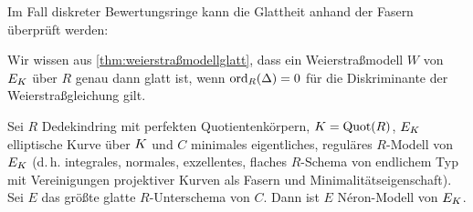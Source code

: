 \documentclass[german]{scrreprt}
\begin{document}
Im Fall diskreter Bewertungsringe kann die Glattheit anhand der Fasern
überprüft werden:
\begin{Bemerkung}
  Wir wissen aus \autoref{thm:weierstraßmodellglatt},
  dass ein Weierstraßmodell $W$ von $E_{K}$ über $R$ genau dann glatt
  ist, wenn $\operatorname{ord}_R(\Delta)=0$ für die Diskriminante der
  Weierstraßgleichung gilt.
\end{Bemerkung}

\begin{Satz}\label{thm:exneronmodelle}

  Sei $R$ Dedekindring mit perfekten Quotientenkörpern,
  $K=\operatorname{Quot}(R)$, $E_{K}$ elliptische Kurve über $K$ und $C$ minimales
  eigentliches, reguläres $R$-Modell von $E_{K}$
  (d.\,h. integrales, normales, exzellentes, flaches $R$-Schema von
  endlichem Typ mit Vereinigungen projektiver Kurven als Fasern und
  Minimalitätseigenschaft).
  Sei $E$ das größte glatte $R$-Unterschema von $C$.
  Dann ist $E$ Néron-Modell von $E_{K}$.


\end{Satz}
\end{document}
